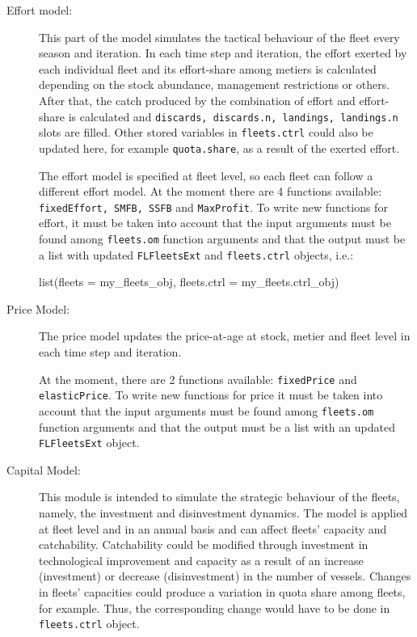 \begin{description}
	\item[Effort model:] This part of the model simulates the tactical behaviour of the fleet every season and iteration.
	 In each time step and iteration, the effort exerted by each individual fleet and its effort-share among metiers is 
	 calculated depending on the stock abundance, management restrictions or others. 
	 After that, the catch produced by the combination of effort and effort-share
	 is calculated and \texttt{discards, discards.n, landings, landings.n} slots are filled.
	 Other stored variables in \texttt{fleets.ctrl} could also be updated here, for example \texttt{quota.share},
	 as a result of the exerted effort. 
	 
	 The effort model is specified at fleet level, so each fleet can follow a different effort model.
	 At the moment there are 4 functions available: \texttt{fixedEffort, SMFB, SSFB} and \texttt{MaxProfit}. 
	 To write new functions for effort, it must be taken into account that the input arguments 
	 must be found among \texttt{fleets.om} function arguments and that the output must be a 
	 list with updated \texttt{FLFleetsExt} and \texttt{fleets.ctrl} objects, i.e.:
				
  \begin{Schunk}
    \begin{Sinput}
    list(fleets = my_fleets_obj, fleets.ctrl = my_fleets.ctrl_obj)
    \end{Sinput}
  \end{Schunk}	 	
		
			 	  
	\item[Price Model:] The price model updates the price-at-age at stock, metier and fleet level in each time
	step and iteration. 
	
	At the moment, there are 2 functions available: 
	\texttt{fixedPrice} and \texttt{elasticPrice}. 
	To write new functions for price it must be taken into account that the input arguments 
	must be found among \texttt{fleets.om} function arguments and that the output must be a 
	list with an updated \texttt{FLFleetsExt} object.
				
	\item[Capital Model:] This module is intended to simulate the strategic behaviour of the fleets, namely, the investment and disinvestment dynamics. 
	The model is applied at fleet level and in an annual basis and can affect fleets'  
	capacity and  catchability. Catchability could be modified through investment in technological improvement 
	and capacity as a result of an increase (investment) or decrease (disinvestment) in the number of vessels.  
	Changes in fleets' capacities could produce a variation in quota share among fleets, for example.
	Thus, the corresponding change would have to be done in \texttt{fleets.ctrl} object. 
	

\end{description}
